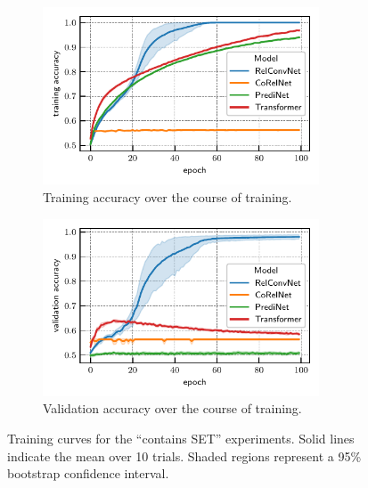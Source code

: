 \begin{figure}[ht]
    \centering
    \begin{subfigure}{0.45\textwidth}
        \centering
        \includegraphics[width=0.9\textwidth]{figs/experiments/contains_set_training_curves_trainacc.pdf}
        \vskip-5pt
        \caption{Training accuracy over the course of training.}\label{fig:contains_set_training_curves_trainacc}
    \end{subfigure}
    \begin{subfigure}{0.45\textwidth}
        \centering
        \includegraphics[width=0.9\textwidth]{figs/experiments/contains_set_training_curves_valacc.pdf}
        \vskip-5pt
        \caption{Validation accuracy over the course of training.}\label{fig:contains_set_training_curves_valacc}
    \end{subfigure}
    \caption{Training curves for the ``contains SET'' experiments. Solid lines indicate the mean over 10 trials. Shaded regions represent a 95\% bootstrap confidence interval.}\label{fig:contains_set_training_curves}
    \vskip-7.5pt
\end{figure}

